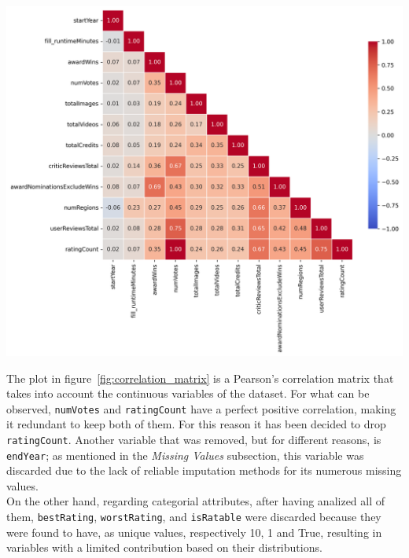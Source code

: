 \noindent
\begin{minipage}{0.48\textwidth}
    \centering
    \includegraphics[width=\linewidth]{plots/correlation_matrix.png}
    \label{fig:correlation_matrix} %
\end{minipage}
\hfill
\begin{minipage}{0.48\textwidth}
    The plot in figure~\ref{fig:correlation_matrix} is a Pearson's correlation matrix that takes into account the continuous variables of the dataset.
For what can be observed, \texttt{numVotes} and \texttt{ratingCount} have a perfect positive correlation, making it redundant to keep both of them.
For this reason it has been decided to drop \texttt{ratingCount}.
Another variable that was removed, but for different reasons, is \texttt{endYear}; as mentioned in the \textit{Missing Values} subsection, this variable was discarded due to the lack of reliable imputation methods for its numerous missing values.\\

On the other hand, regarding categorial attributes, after having analized all of them, \texttt{bestRating}, \texttt{worstRating}, and \texttt{isRatable} were discarded because 
they were found to have, as unique values, respectively 10, 1 and True, resulting in variables with a limited contribution based on their distributions.
\end{minipage}